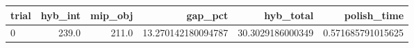 \begin{tabular}{lrrrrr}
\hline
trial & hyb_int & mip_obj & gap_pct & hyb_total & polish_time \\ \hline
0 & 239.0 & 211.0 & 13.270142180094787 & 30.3029186000349 & 0.571685791015625 \\
\hline
\end{tabular}

